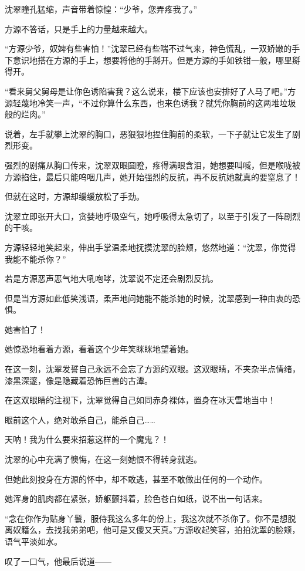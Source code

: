 \begin{this_body}
沈翠瞳孔猛缩，声音带着惊惶：“少爷，您弄疼我了。”

方源不答话，只是手上的力量越来越大。

“方源少爷，奴婢有些害怕！”沈翠已经有些喘不过气来，神色慌乱，一双娇嫩的手下意识地搭在方源的手上，想要将他的手掰开。但是方源的手如铁钳一般，哪里掰得开。

“看来舅父舅母是让你色诱陷害我？这么说来，楼下应该也安排好了人马了吧。”方源轻蔑地冷笑一声，“不过你算什么东西，也来色诱我？就凭你胸前的这两堆垃圾般的烂肉。”

说着，左手就攀上沈翠的胸口，恶狠狠地捏住胸前的柔软，一下子就让它发生了剧烈形变。

强烈的剧痛从胸口传来，沈翠双眼圆瞪，疼得满眼含泪，她想要叫喊，但是喉咙被方源掐住，最后只能呜咽几声，她开始强烈的反抗，再不反抗她就真的要窒息了！

但就在这时，方源却缓缓放松了手劲。

沈翠立即张开大口，贪婪地呼吸空气，她呼吸得太急切了，以至于引发了一阵剧烈的干咳。

方源轻轻地笑起来，伸出手掌温柔地抚摸沈翠的脸颊，悠然地道：“沈翠，你觉得我能不能杀你？”

若是方源恶声恶气地大吼咆哮，沈翠说不定还会剧烈反抗。

但是当方源如此低笑浅语，柔声地问她能不能杀她的时候，沈翠感到一种由衷的恐惧。

她害怕了！

她惊恐地看着方源，看着这个少年笑眯眯地望着她。

在这一刻，沈翠发誓自己永远不会忘了方源的双眼。这双眼睛，不夹杂半点情绪，漆黑深邃，像是隐藏着恐怖巨兽的古潭。

在这双眼睛的注视下，沈翠觉得自己如同赤身裸体，置身在冰天雪地当中！

眼前这个人，绝对敢杀自己，能杀自己……

天呐！我为什么要来招惹这样的一个魔鬼？！

沈翠的心中充满了懊悔，在这一刻她恨不得转身就逃。

但她此刻投身在方源的怀中，却不敢逃，甚至不敢做出任何的一个动作。

她浑身的肌肉都在紧张，娇躯颤抖着，脸色苍白如纸，说不出一句话来。

“念在你作为贴身丫鬟，服侍我这么多年的份上，我这次就不杀你了。你不是想脱离奴籍么，去找我弟弟吧，他可是又傻又天真。”方源收起笑容，拍拍沈翠的脸颊，语气平淡如水。

叹了一口气，他最后说道——


\end{this_body}
